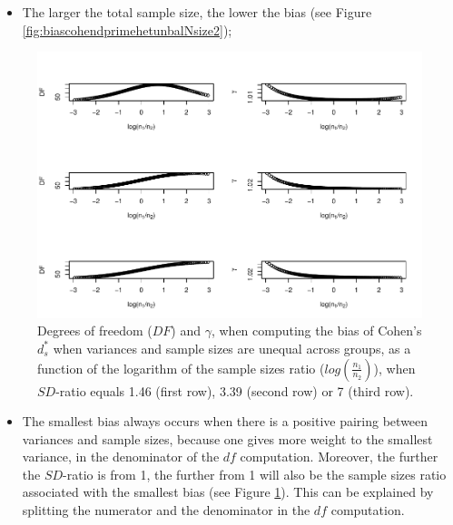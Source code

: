 \documentclass[
  english,
  man,mask]{apa6}
\providecommand{\tightlist}{%
  \setlength{\itemsep}{0pt}\setlength{\parskip}{0pt}}
\begin{document}
\begin{itemize}
\tightlist
\item
  The larger the total sample size, the lower the bias (see Figure \ref{fig:biascohendprimehetunbalNsize2});
\end{itemize}

\begin{figure}
\centering
\includegraphics{Theoretical-Bias-of-all-estimators-as-a-function-of-population-parameters_files/figure-latex/biascohendprimehetunbalnratiosdratio2-1.pdf}
\caption{\label{fig:biascohendprimehetunbalnratiosdratio2}Degrees of freedom (\(DF\)) and \(\gamma\), when computing the bias of Cohen's \(d^*_s\) when variances and sample sizes are unequal across groups, as a function of the logarithm of the sample sizes ratio (\(log \left( \frac{n_1}{n_2} \right)\)), when \(SD\)-ratio equals 1.46 (first row), 3.39 (second row) or 7 (third row).}
\end{figure}

\begin{itemize}
\tightlist
\item
  The smallest bias always occurs when there is a positive pairing between variances and sample sizes, because one gives more weight to the smallest variance, in the denominator of the \(df\) computation. Moreover, the further the \(SD\)-ratio is from 1, the further from 1 will also be the sample sizes ratio associated with the smallest bias (see Figure \ref{fig:biascohendprimehetunbalnratiosdratio2}). This can be explained by splitting the numerator and the denominator in the \(df\) computation.
\end{itemize}
\end{document}
